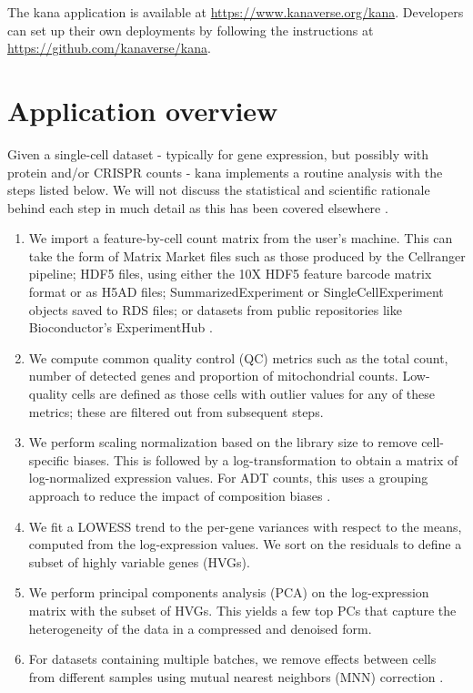 \documentclass{article}
\begin{document}
The kana application is available at \url{https://www.kanaverse.org/kana}.
Developers can set up their own deployments by following the instructions at \url{https://github.com/kanaverse/kana}.

\section{Application overview}

Given a single-cell dataset - typically for gene expression, but possibly with protein and/or CRISPR counts - kana implements a routine analysis with the steps listed below.
We will not discuss the statistical and scientific rationale behind each step in much detail as this has been covered elsewhere \cite{oscabook}.

\begin{enumerate}
\item We import a feature-by-cell count matrix from the user's machine.
This can take the form of Matrix Market files such as those produced by the Cellranger pipeline;
HDF5 files, using either the 10X HDF5 feature barcode matrix format or as H5AD files; 
SummarizedExperiment or SingleCellExperiment objects \cite{amezquita2020orchestrating} saved to RDS files;
or datasets from public repositories like Bioconductor's ExperimentHub \cite{morgan2019experimenthub}.
\item We compute common quality control (QC) metrics such as the total count, number of detected genes and proportion of mitochondrial counts.
Low-quality cells are defined as those cells with outlier values for any of these metrics; these are filtered out from subsequent steps.
\item We perform scaling normalization based on the library size to remove cell-specific biases.
This is followed by a log-transformation to obtain a matrix of log-normalized expression values.
For ADT counts, this uses a grouping approach to reduce the impact of composition biases \cite{lun2016pooling}.
\item We fit a LOWESS trend \cite{cleveland1979robust} to the per-gene variances with respect to the means, computed from the log-expression values.
We sort on the residuals to define a subset of highly variable genes (HVGs). 
\item We perform principal components analysis (PCA) on the log-expression matrix with the subset of HVGs.
This yields a few top PCs that capture the heterogeneity of the data in a compressed and denoised form.
\item For datasets containing multiple batches, we remove effects between cells from different samples using mutual nearest neighbors (MNN) correction \cite{haghverdi2018batch}. 

\end{enumerate}
\end{document}
